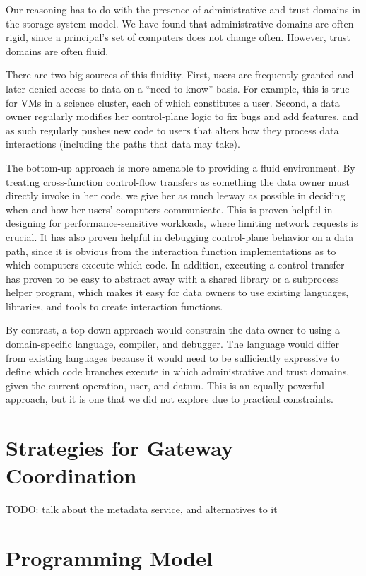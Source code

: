 Our reasoning has to do with the presence of administrative and trust domains in
the storage system model.  We have found that administrative domains are often
rigid, since a principal's set of computers does not change often.  However,
trust domains are often fluid.

There are two big sources of this fluidity.  First, users are frequently granted
and later denied access to data on a ``need-to-know'' basis.  For example, this 
is true for VMs in a science cluster, each of which constitutes a user.  Second, a data
owner regularly modifies her control-plane logic to fix bugs and add features,
and as such regularly pushes new code to users that alters how they process data
interactions (including the paths that data may take).

The bottom-up approach is more amenable to providing a fluid environment.
By treating cross-function control-flow transfers as something the
data owner must directly invoke in her code, we give her as much leeway as possible
in deciding when and how her users' computers communicate.  This is proven
helpful in designing for performance-sensitive workloads, where limiting network
requests is crucial.  It has also proven helpful in debugging control-plane
behavior on a data path, since it is obvious from the interaction function
implementations as to which computers execute which code.  In addition,
executing a control-transfer has proven to be easy to abstract away with a shared library or a
subprocess helper program, which makes it easy for data owners to use existing
languages, libraries, and tools to create interaction functions.

By contrast, a top-down approach would constrain the data owner 
to using a domain-specific language, compiler, and
debugger.  The language would differ from existing languages because it would
need to be sufficiently expressive to define which code branches execute in which
administrative and trust domains, given the current operation, user, and datum.
This is an equally powerful approach, but it is one that we did not explore due
to practical constraints.

\section{Strategies for Gateway Coordination}

TODO: talk about the metadata service, and alternatives to it

\section{Programming Model}

